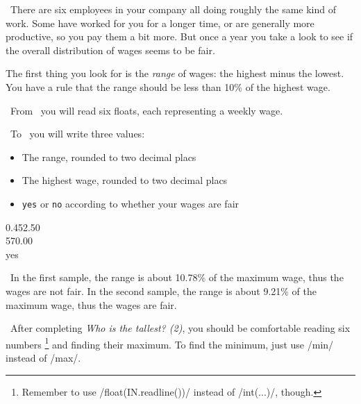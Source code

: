 

\Question\ There are six employees in your company all doing roughly the same kind of
work. Some have worked for you for a longer time, or are generally more productive, so you
pay them a bit more. But once a year you take a look to see if the overall distribution of
wages seems to be fair.

The first thing you look for is the \emph{range} of wages: the highest minus the lowest.
You have a rule that the range should be less than 10\% of the highest wage.

\Input\ From \IN\ you will read six floats, each representing a weekly wage.

\Output\ To \OUT\ you will write three values:
\begin{itemize}
  \item The range, rounded to two decimal placs
  \item The highest wage, rounded to two decimal placs
  \item \texttt{yes} or \texttt{no} according to whether your wages are fair
\end{itemize}

\Sample

             {
                     {0.4}{52.50\\570.00\\yes}}

\Explanation\ In the first sample, the range is about 10.78\% of the maximum wage, thus
the wages are not fair. In the second sample, the range is about 9.21\% of the maximum
wage, thus the wages are fair.

\Scratch\ After completing \emph{Who is the tallest? (2)}, you should be comfortable
reading six numbers%
\footnote{Remember to use \pycode/float(IN.readline())/ instead of \pycode/int(...)/,
though.}
and finding their maximum. To find the minimum, just use \pycode/min/ instead of
\pycode/max/.

